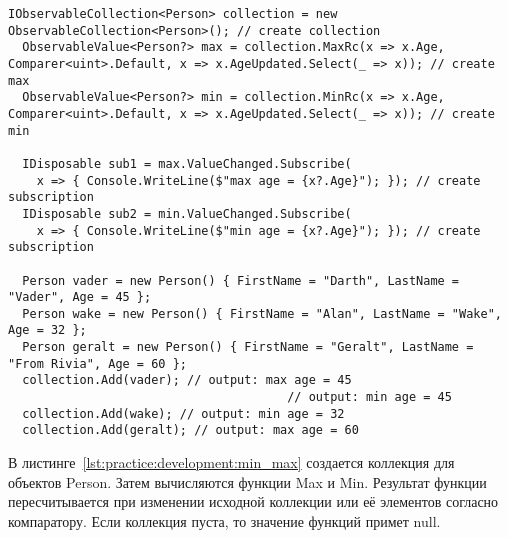 \begin{lstlisting}[style=csharpinlinestyle, caption={Пример использования Min и Max}, label=lst:practice:development:min_max]
  IObservableCollection<Person> collection = new ObservableCollection<Person>(); // create collection
  ObservableValue<Person?> max = collection.MaxRc(x => x.Age, Comparer<uint>.Default, x => x.AgeUpdated.Select(_ => x)); // create max
  ObservableValue<Person?> min = collection.MinRc(x => x.Age, Comparer<uint>.Default, x => x.AgeUpdated.Select(_ => x)); // create min

  IDisposable sub1 = max.ValueChanged.Subscribe(
    x => { Console.WriteLine($"max age = {x?.Age}"); }); // create subscription
  IDisposable sub2 = min.ValueChanged.Subscribe(
    x => { Console.WriteLine($"min age = {x?.Age}"); }); // create subscription

  Person vader = new Person() { FirstName = "Darth", LastName = "Vader", Age = 45 };
  Person wake = new Person() { FirstName = "Alan", LastName = "Wake", Age = 32 };
  Person geralt = new Person() { FirstName = "Geralt", LastName = "From Rivia", Age = 60 };
  collection.Add(vader); // output: max age = 45
                                       // output: min age = 45
  collection.Add(wake); // output: min age = 32
  collection.Add(geralt); // output: max age = 60
\end{lstlisting}

В листинге~\ref{lst:practice:development:min_max} создается коллекция для объектов Person. Затем вычисляются функции Max и Min.
Результат функции пересчитывается при изменении исходной коллекции или её элементов согласно компаратору. Если коллекция пуста, то значение функций примет null.
